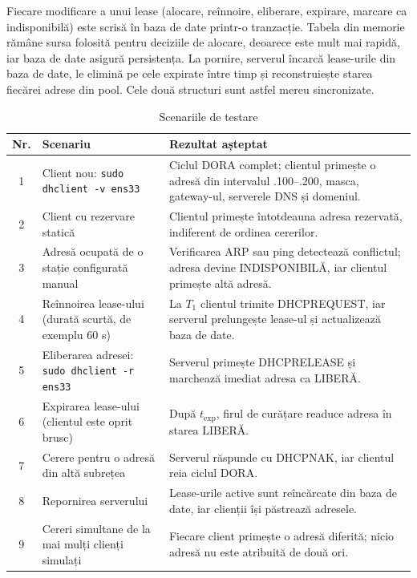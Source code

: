 \documentclass[conference]{IEEEtran}
\begin{document}
Fiecare modificare a unui lease (alocare, reînnoire, eliberare, expirare, marcare ca indisponibilă) este scrisă în baza de date printr-o tranzacție. Tabela din memorie rămâne sursa folosită pentru deciziile de alocare, deoarece este mult mai rapidă, iar baza de date asigură persistența. La pornire, serverul încarcă lease-urile din baza de date, le elimină pe cele expirate între timp și reconstruiește starea fiecărei adrese din pool. Cele două structuri sunt astfel mereu sincronizate.

\begin{table}[!t]
\caption{Scenariile de testare}
\begin{center}
\begin{tabular}{|c|p{5.4cm}|p{9.6cm}|}
\hline
\textbf{Nr.} & \textbf{Scenariu} & \textbf{Rezultat așteptat} \\
\hline
1 & Client nou: \texttt{sudo dhclient -v ens33} & Ciclul DORA complet; clientul primește o adresă din intervalul .100--.200, masca, gateway-ul, serverele DNS și domeniul. \\
\hline
2 & Client cu rezervare statică & Clientul primește întotdeauna adresa rezervată, indiferent de ordinea cererilor. \\
\hline
3 & Adresă ocupată de o stație configurată manual & Verificarea ARP sau ping detectează conflictul; adresa devine INDISPONIBILĂ, iar clientul primește altă adresă. \\
\hline
4 & Reînnoirea lease-ului (durată scurtă, de exemplu 60 s) & La $T_1$ clientul trimite DHCPREQUEST, iar serverul prelungește lease-ul și actualizează baza de date. \\
\hline
5 & Eliberarea adresei: \texttt{sudo dhclient -r ens33} & Serverul primește DHCPRELEASE și marchează imediat adresa ca LIBERĂ. \\
\hline
6 & Expirarea lease-ului (clientul este oprit brusc) & După $t_{\text{exp}}$, firul de curățare readuce adresa în starea LIBERĂ. \\
\hline
7 & Cerere pentru o adresă din altă subrețea & Serverul răspunde cu DHCPNAK, iar clientul reia ciclul DORA. \\
\hline
8 & Repornirea serverului & Lease-urile active sunt reîncărcate din baza de date, iar clienții își păstrează adresele. \\
\hline
9 & Cereri simultane de la mai mulți clienți simulați & Fiecare client primește o adresă diferită; nicio adresă nu este atribuită de două ori. \\
\hline
\end{tabular}
\label{tab:teste}
\end{center}
\end{table}
\end{document}

